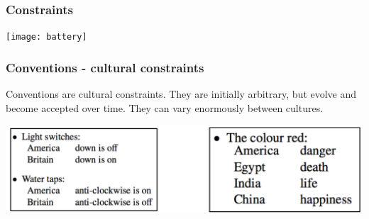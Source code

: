 \documentclass{beamer}
\begin{document}
\begin{frame}
\frametitle{Constraints}
\centering
\texttt{[image: battery]}
\end{frame}

%

%

\begin{frame}
\frametitle{Conventions - cultural constraints}
Conventions are cultural constraints.  They are initially arbitrary, but evolve and become accepted over time.   They can vary enormously between cultures. \vfill

\centering
\includegraphics[width=0.9\linewidth]{convention}
\end{frame}
\end{document}
